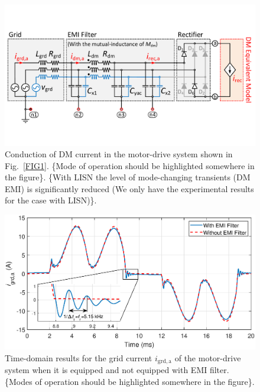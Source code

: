 \documentclass[journal,a4paper,10pt,twoside]{IEEEtran} %
\begin{document}
		\begin{figure}[t]
			    \centering
			    \includegraphics[clip, trim=0cm 3cm 0cm 3cm, width=1\linewidth]{FIGS/FIG_3.pdf}
			    \caption{Conduction of DM current in the motor-drive system shown in Fig.~\ref{FIG1}. {\color{red}\{Mode of operation should be highlighted somewhere in the figure\}.}
			    {\color{red}\{With LISN the level of mode-changing transients (DM EMI) is significantly reduced (We only have the experimental results for the case with LISN)\}.}}
			    \label{FIG3}
	    \end{figure}
		
		\begin{figure}[t]
	        \centering
		        \includegraphics[clip, trim=1.25cm 6.5cm 1.25cm 7cm, width=1\linewidth]{FIGS/FIG_4.eps}
		    \caption{Time-domain results for the grid current $i_{\mathrm{grd,a}}$ of the motor-drive system when it is equipped and not equipped with EMI filter. {\color{red}\{Modes of operation should be highlighted somewhere in the figure\}.}}
		    \label{FIG11}
	    \end{figure}
\end{document}
